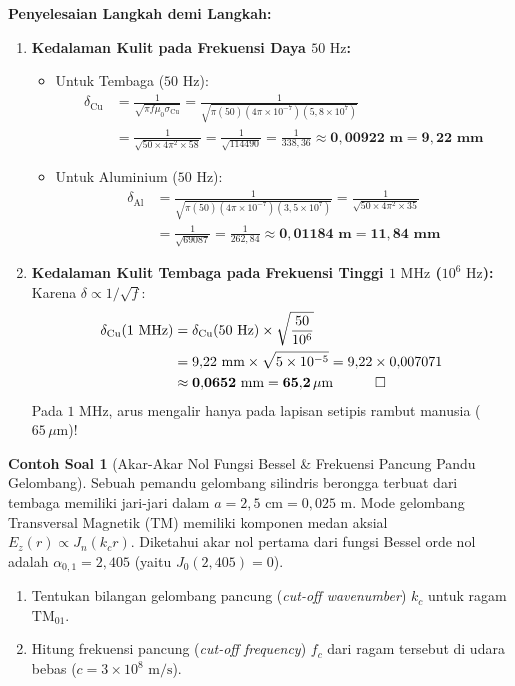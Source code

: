 \documentclass[11pt,a4paper]{article}
\theoremstyle{definition}
\newtheorem{example}{Contoh Soal}[section]
\begin{document}
\noindent\textbf{Penyelesaian Langkah demi Langkah:}
\begin{enumerate}[leftmargin=*]
    \item \textbf{Kedalaman Kulit pada Frekuensi Daya $50\text{ Hz}$:}
    \begin{itemize}[leftmargin=*]
        \item Untuk Tembaga ($50\text{ Hz}$):
        \begin{align*}
            \delta_{\text{Cu}} &= \frac{1}{\sqrt{\pi f \mu_0 \sigma_{\text{Cu}}}} = \frac{1}{\sqrt{\pi (50)(4\pi \times 10^{-7})(5{,}8 \times 10^7)}} \\
            &= \frac{1}{\sqrt{50 \times 4 \pi^2 \times 58}} = \frac{1}{\sqrt{114490}} = \frac{1}{338{,}36} \approx \mathbf{0{,}00922\text{ m} = 9{,}22\text{ mm}}
        \end{align*}
        \item Untuk Aluminium ($50\text{ Hz}$):
        \begin{align*}
            \delta_{\text{Al}} &= \frac{1}{\sqrt{\pi (50)(4\pi \times 10^{-7})(3{,}5 \times 10^7)}} = \frac{1}{\sqrt{50 \times 4 \pi^2 \times 35}} \\
            &= \frac{1}{\sqrt{69087}} = \frac{1}{262{,}84} \approx \mathbf{0{,}01184\text{ m} = 11{,}84\text{ mm}}
        \end{align*}
    \end{itemize}
    
    \item \textbf{Kedalaman Kulit Tembaga pada Frekuensi Tinggi $1\text{ MHz}$ ($10^6\text{ Hz}$):}
    Karena $\delta \propto 1/\sqrt{f}$:
    \begin{align*}
        \delta_{\text{Cu}}(1\text{ MHz}) &= \delta_{\text{Cu}}(50\text{ Hz}) \times \sqrt{\frac{50}{10^6}} \\
        &= 9{,}22\text{ mm} \times \sqrt{5 \times 10^{-5}} = 9{,}22 \times 0{,}007071 \\
        &\approx \mathbf{0{,}0652\text{ mm} = 65{,}2\,\mu\text{m}} \quad \qed
    \end{align*}
    Pada $1\text{ MHz}$, arus mengalir hanya pada lapisan setipis rambut manusia ($65\,\mu\text{m}$)!
\end{enumerate}

\begin{example}[Akar-Akar Nol Fungsi Bessel \& Frekuensi Pancung Pandu Gelombang]
Sebuah pemandu gelombang silindris berongga terbuat dari tembaga memiliki jari-jari dalam $a = 2{,}5\text{ cm} = 0{,}025\text{ m}$. Mode gelombang Transversal Magnetik (TM) memiliki komponen medan aksial $E_z(r) \propto J_n(k_c r)$.
Diketahui akar nol pertama dari fungsi Bessel orde nol adalah $\alpha_{0,1} = 2{,}405$ (yaitu $J_0(2{,}405) = 0$).
\begin{enumerate}[leftmargin=*]
    \item Tentukan bilangan gelombang pancung (\textit{cut-off wavenumber}) $k_c$ untuk ragam $\text{TM}_{01}$.
    \item Hitung frekuensi pancung (\textit{cut-off frequency}) $f_c$ dari ragam tersebut di udara bebas ($c = 3 \times 10^8\text{ m/s}$).
\end{enumerate}
\end{example}
\end{document}
